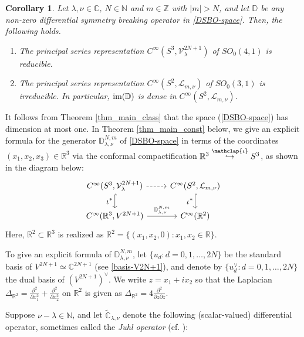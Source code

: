 \documentclass[12pt, pdflatex, a4paper]{article}
\theoremstyle{plain}
\newtheorem{corol}[thm]{Corollary}
\theoremstyle{definition}
\def\C{{\mathbb C}}
\def\D{\mathbb{D}}
\def\im{\text{\normalfont{im}}}
\def\L{\mathcal{L}}
\def\N{{\mathbb N}}
\def\R{{\mathbb R}}
\def\V{\mathcal{V}}
\def\Z{{\mathbb Z}}
\newcommand\arrowiota{\stackrel{\mathclap{\iota}}{\hookrightarrow}}
\begin{document}
\begin{corol}\label{corol_main} Let $\lambda, \nu \in \C$, $N \in \N$ and $m \in \Z$ with $|m| > N$, and let $\D$ be any non-zero differential symmetry breaking operator in \eqref{DSBO-space}. Then, the following holds.
\begin{enumerate}[label=\normalfont{(\arabic*)}]
\item The principal series representation $C^\infty(S^3, \V^{2N+1}_\lambda)$ of $SO_0(4,1)$ is reducible.
\item The principal series representation $C^\infty(S^2, \L_{m, \nu})$ of $SO_0(3,1)$ is irreducible. In particular, $\im(\D)$ is dense in $C^\infty(S^2, \L_{m, \nu})$.
\end{enumerate}
\end{corol}

It follows from Theorem \ref{thm_main_class} that the space (\ref{DSBO-space}) has dimension at most one. In Theorem \ref{thm_main_const} below, we give an explicit formula for the generator $\D_{\lambda, \nu}^{N, m}$ of \eqref{DSBO-space} in terms of the coordinates $(x_1, x_2, x_3) \in \R^3$ via the conformal compactification $\R^3 \arrowiota S^3$, as shown in the diagram below:
\begin{equation*}
\begin{tikzcd}
C^\infty(S^3, \V_\lambda^{2N+1}) \arrow[d, hookrightarrow, "{\displaystyle{\iota^*}}"'] \arrow[r, dashed] & C^\infty(S^2, \L_{m, \nu}) \arrow[d, hookrightarrow, "{\displaystyle{\iota^*}}"']\\
C^\infty(\R^3, V^{2N+1}) \arrow[r, "\D_{\lambda, \nu}^{N, m}"] & C^\infty(\R^2)
\end{tikzcd}
\end{equation*}
Here,  $\R^2 \subset \R^3$ is realized as $\R^2 = \{(x_1, x_2, 0) : x_1, x_2 \in \R\}$.

To give an explicit formula of $\D_{\lambda, \nu}^{N, m}$, let $\{u_d : d = 0, 1, \ldots, 2N\}$ be the standard basis of $V^{2N+1} \simeq \C^{2N+1}$ (see \eqref{basis-V2N+1}), and denote by $\{u_d^\vee : d = 0, 1, \ldots, 2N\}$ the dual basis of $(V^{2N+1})^\vee$. We write $z = x_1 +ix_2$ so that the Laplacian $\Delta_{\R^2} = \frac{\partial^2}{\partial x_1^2} + \frac{\partial^2}{\partial x_2^2}$ on $\R^2$ is given as $\Delta_{\R^2} = 4\frac{\partial^2}{\partial z \partial \overline{z}}$.

Suppose $\nu-\lambda \in \N$, and let $\widetilde{\C}_{\lambda, \nu}$ denote the following (scalar-valued) differential operator, sometimes called the \emph{Juhl operator} (cf. \cite[2.22]{KKP16}):
\end{document}
